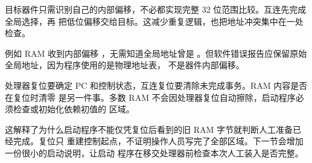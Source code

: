 目标器件只需识别自己的内部偏移，不必都实现完整 32 位范围比较。互连先完成全局选择，再
把低位偏移交给目标。这减少重复逻辑，也把地址冲突集中在一处检查。

例如 RAM 收到内部偏移 ，无需知道全局地址曾是
。但软件错误报告应保留原始全局地址，因为程序使用的是物理地址表，
不是器件内部偏移。


处理器复位要确定 PC 和控制状态，互连复位要清除未完成事务。RAM 内容是否在复位时清零
是另一件事。多数 RAM 不会因处理器复位自动擦除，启动程序必须检查或初始化依赖初值的
区域。

这解释了为什么启动程序不能仅凭复位后看到的旧 RAM 字节就判断人工准备已经完成。复位只
重建控制起点，不证明操作人员写完了全部区域。下一节会增加一份很小的启动说明，让启动
程序在移交处理器前检查本次人工装入是否完整。
